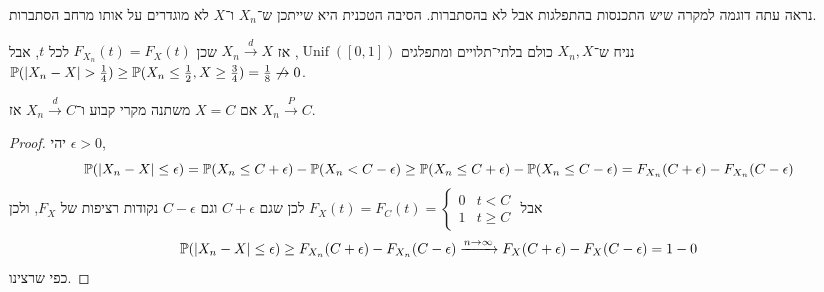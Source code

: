 נראה עתה דוגמה למקרה שיש התכנסות בהתפלגות אבל לא בהסתברות.
הסיבה הטכנית היא שייתכן ש־$X_n$ ו־$X$ לא מוגדרים על אותו מרחב הסתברות.
\begin{example}
	נניח ש־$X_n, X$ כולם בלתי־תלויים ומתפלגים $\operatorname{Unif}([0, 1])$, אז $X_n \xrightarrow{d} X$ שכן $F_{X_n}(t) = F_X(t)$ לכל $t$,
	אבל $\mathbb{P}(|X_n - X| > \frac{1}{4}) \ge \mathbb{P}(X_n \le \frac{1}{2}, X \ge \frac{3}{4}) = \frac{1}{8} \not\to 0$.
\end{example}
\begin{proposition}
	אם $X = C$ משתנה מקרי קבוע ו־$X_n \xrightarrow{d} C$ אז $X_n \xrightarrow{P} C$.
\end{proposition}
\begin{proof}
	יהי $\epsilon > 0$,
	\[
		\mathbb{P}(|X_n - X| \le \epsilon)
		= \mathbb{P}(X_n \le C + \epsilon) - \mathbb{P}(X_n < C - \epsilon)
		\ge \mathbb{P}(X_n \le C + \epsilon) - \mathbb{P}(X_n \le C - \epsilon)
		= F_{X_n}(C + \epsilon) - F_{X_n}(C - \epsilon)
	\]
	אבל $F_X(t) = F_C(t) = \begin{cases}
		0 & t < C \\
		1 & t \ge C
	\end{cases}$
	לכן שגם $C + \epsilon$ וגם $C - \epsilon$ נקודות רציפות של $F_X$,
	ולכן
	\[
		\mathbb{P}(|X_n - X| \le \epsilon)
		\ge F_{X_n}(C + \epsilon) - F_{X_n}(C - \epsilon)
		\xrightarrow{n \to \infty} F_X(C + \epsilon) - F_X(C - \epsilon)
		= 1 - 0
	\]
	כפי שרצינו.
\end{proof}


